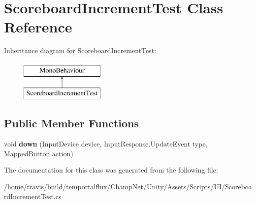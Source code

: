 \hypertarget{class_scoreboard_increment_test}{\section{Scoreboard\-Increment\-Test Class Reference}
\label{class_scoreboard_increment_test}
}
Inheritance diagram for Scoreboard\-Increment\-Test\-:\begin{figure}[H]
\begin{center}
\leavevmode
\includegraphics[height=2.000000cm]{class_scoreboard_increment_test}
\end{center}
\end{figure}
\subsection*{Public Member Functions}
\begin{DoxyCompactItemize}
\item 
\hypertarget{class_scoreboard_increment_test_a727b58ab4929807cb1b363aef6cb630c}{void {\bfseries down} (Input\-Device device, Input\-Response.\-Update\-Event type, Mapped\-Button action)}\label{class_scoreboard_increment_test_a727b58ab4929807cb1b363aef6cb630c}

\end{DoxyCompactItemize}


The documentation for this class was generated from the following file\-:\begin{DoxyCompactItemize}
\item 
/home/travis/build/temportalflux/\-Champ\-Net/\-Unity/\-Assets/\-Scripts/\-U\-I/Scoreboard\-Increment\-Test.\-cs\end{DoxyCompactItemize}
